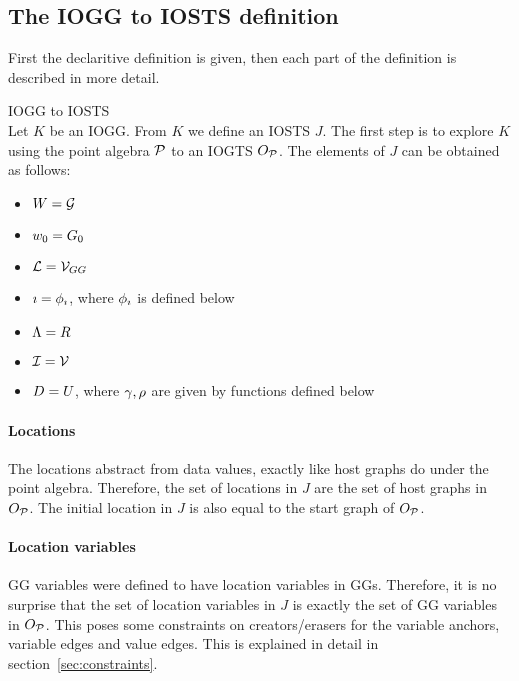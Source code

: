 \subsection{The IOGG to IOSTS definition}\label{sec:iogg_to_iosts_definition}
First the declaritive definition is given, then each part of the definition is described in more detail.
\vspace{2px}\begin{definition} IOGG to IOSTS \\
Let $K$ be an IOGG. From $K$ we define an IOSTS $J$. The first step is to explore $K$ using the point algebra $\mathcal{P}$ to an IOGTS $O_{\mathcal{P}}$. The elements of $J$ can be obtained as follows:
\begin{itemize}
\item $W = \mathcal{G}$
\item $w_0 = G_0$
\item $\mathcal{L} = \mathcal{V}_{GG}$
\item $\imath = \phi_{\imath}$, where $\phi_{\imath}$ is defined below
\item $\Lambda = R$
\item $\mathcal{I} = \mathcal{V}$
\item $D = U$, where $\gamma, \rho$ are given by functions defined below
\end{itemize}
\end{definition}

\paragraph*{Locations} The locations abstract from data values, exactly like host graphs do under the point algebra. Therefore, the set of locations in $J$ are the set of host graphs in $O_{\mathcal{P}}$. The initial location in $J$ is also equal to the start graph of $O_{\mathcal{P}}$.

\paragraph*{Location variables} GG variables were defined to have location variables in GGs. Therefore, it is no surprise that the set of location variables in $J$ is exactly the set of GG variables in $O_{\mathcal{P}}$. This poses some constraints on creators/erasers for the variable anchors, variable edges and value edges. This is explained in detail in section~\ref{sec:constraints}.


